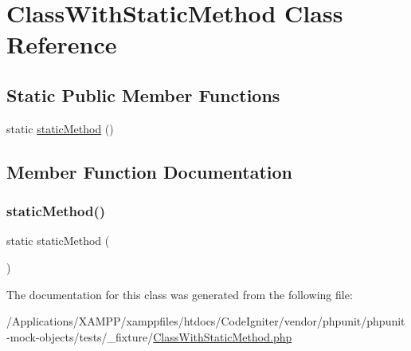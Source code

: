 \hypertarget{class_class_with_static_method}{}\section{Class\+With\+Static\+Method Class Reference}
\label{class_class_with_static_method}
\subsection*{Static Public Member Functions}
\begin{DoxyCompactItemize}
\item 
static \mbox{\hyperlink{class_class_with_static_method_a15469694bbe0f96a3e717f2796a00330}{static\+Method}} ()
\end{DoxyCompactItemize}


\subsection{Member Function Documentation}
\mbox{\label{class_class_with_static_method_a15469694bbe0f96a3e717f2796a00330}} 
\subsubsection{\texorpdfstring{static\+Method()}{staticMethod()}}
{\footnotesize\ttfamily static static\+Method (\begin{DoxyParamCaption}{ }\end{DoxyParamCaption})\hspace{0.3cm}{\ttfamily [static]}}



The documentation for this class was generated from the following file\+:\begin{DoxyCompactItemize}
\item 
/\+Applications/\+X\+A\+M\+P\+P/xamppfiles/htdocs/\+Code\+Igniter/vendor/phpunit/phpunit-\/mock-\/objects/tests/\+\_\+fixture/\mbox{\hyperlink{_class_with_static_method_8php}{Class\+With\+Static\+Method.\+php}}\end{DoxyCompactItemize}
